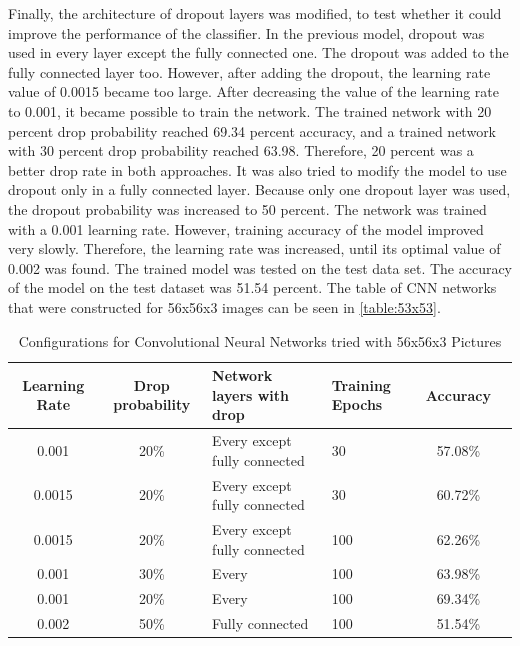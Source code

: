 Finally, the architecture of dropout layers was modified, to test whether it could improve the performance of the classifier. In the previous model, dropout was used in every layer except the fully connected one. The dropout was added to the fully connected layer too. However, after adding the dropout, the learning rate value of 0.0015 became too large. After decreasing the value of the learning rate to 0.001, it became possible to train the network. The trained network with 20 percent drop probability reached 69.34 percent accuracy, and a trained network with 30 percent drop probability reached 63.98. Therefore, 20 percent was a better drop rate in both approaches. It was also tried to modify the model to use dropout only in a fully connected layer. Because only one dropout layer was used, the dropout probability was increased to 50 percent. The network was trained with a 0.001 learning rate. However, training accuracy of the model improved very slowly. Therefore, the learning rate was increased, until its optimal value of 0.002 was found. The trained model was tested on the test data set. The accuracy of the model on the test dataset was 51.54 percent. The table of CNN networks that were constructed for 56x56x3 images can be seen in \autoref{table:53x53}.


\begin{table}[h]
\begin{center}
\begin{tabular}{ |c|c|p{3.3 cm}|p{2 cm}|c|c|} 
 \hline
 Learning Rate & Drop probability & Network layers with drop &Training Epochs&Accuracy \\   \hline
0.001   &   20\%  & Every except fully  connected  & 30 & 57.08\% \\ \hline
0.0015    &   20\%   &  Every  except fully connected  & 30  & 60.72\% \\ \hline
0.0015    &   20\%   &  Every  except fully connected  & 100  & 62.26\% \\ \hline
0.001    &   30\%   &  Every  & 100  & 63.98\% \\ \hline
0.001    &   20\%   &  Every  & 100  & 69.34\% \\ \hline
0.002    &   50\%   &  Fully connected& 100  & 51.54\% \\  \hline
\end{tabular}
\caption{Configurations for Convolutional Neural Networks tried with 56x56x3 Pictures}
\label{table:53x53}
\end{center}
\end{table}



